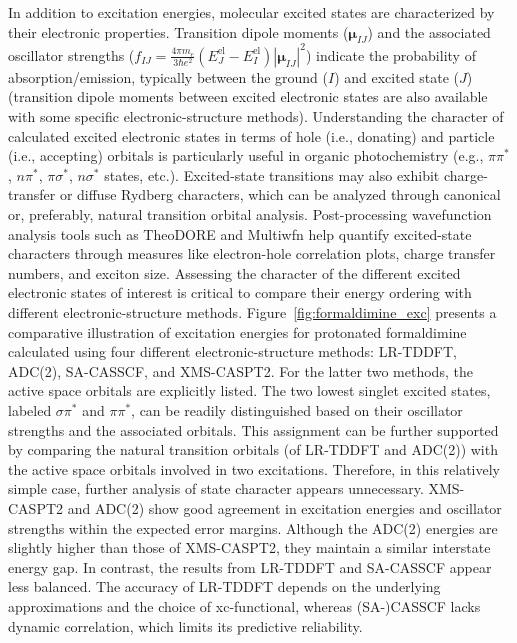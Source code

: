 \documentclass[9pt,bestpractices]{livecoms}
\begin{document}
In addition to excitation energies, molecular excited states are characterized by their electronic properties. Transition dipole moments ($\boldsymbol{\mu}_{IJ}$) and the associated oscillator strengths ($f_{IJ}=\frac{4 \pi m_e }{3 \hbar e^2} (E_J^{\text{el}}-E_I^{\text{el}}) |\boldsymbol{\mu}_{IJ}|^2$) indicate the probability of absorption/emission, typically between the ground ($I$) and excited state ($J$) (transition dipole moments between excited electronic states are also available with some specific electronic-structure methods\cite{jacquemin2025betweenes}). Understanding the character of calculated excited electronic states in terms of hole (i.e., donating) and particle (i.e., accepting) orbitals is particularly useful in organic photochemistry (e.g., $\pi\pi^\ast$, $n\pi^\ast$, $\pi\sigma^\ast$, $n\sigma^\ast$ states, etc.). Excited-state transitions may also exhibit charge-transfer or diffuse Rydberg characters, which can be analyzed through canonical or, preferably, natural transition orbital analysis. Post-processing wavefunction analysis tools such as TheoDORE\cite{plasser2020theodore} and Multiwfn\cite{lu2024comprehensive} help quantify excited-state characters through measures like electron-hole correlation plots, charge transfer numbers, and exciton size. Assessing the character of the different excited electronic states of interest is critical to compare their energy ordering with different electronic-structure methods.
Figure~\ref{fig:formaldimine_exc} presents a comparative illustration of excitation energies for protonated formaldimine calculated using four different electronic-structure methods: LR-TDDFT, ADC(2), SA-CASSCF, and XMS-CASPT2. For the latter two methods, the active space orbitals are explicitly listed. The two lowest singlet excited states, labeled $\sigma\pi^\ast$ and $\pi\pi^\ast$, can be readily distinguished based on their oscillator strengths and the associated orbitals. This assignment can be further supported by comparing the natural transition orbitals (of LR-TDDFT and ADC(2)) with the active space orbitals involved in two excitations. Therefore, in this relatively simple case, further analysis of state character appears unnecessary. XMS-CASPT2 and ADC(2) show good agreement in excitation energies and oscillator strengths within the expected error margins. Although the ADC(2) energies are slightly higher than those of XMS-CASPT2, they maintain a similar interstate energy gap. In contrast, the results from LR-TDDFT and SA-CASSCF appear less balanced. The accuracy of LR-TDDFT depends on the underlying approximations and the choice of xc-functional, whereas (SA-)CASSCF lacks dynamic correlation, which limits its predictive reliability.
\end{document}
